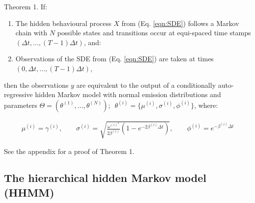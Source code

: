 \begin{theorem}{Theorem 1.}{}%
If:
\begin{enumerate}
    \item The hidden behavioural process $X$ from (Eq. \ref{eqn:SDE}) follows a Markov chain with $N$ possible states and transitions occur at equi-spaced time stamps $\left(\Delta t, \ldots, (T-1)\Delta t\right)$, and:
    \item Observations of the SDE from (Eq. \ref{eqn:SDE}) are taken at times $\left(0, \Delta t, \ldots, (T-1)\Delta t\right)$,
\end{enumerate}
then the observations $y$ are equivalent to the output of a conditionally auto-regressive hidden Markov model with normal emission distributions and parameters $\Theta = (\theta^{(1)}, \ldots, \theta^{(N)}); \enspace \theta^{(i)} = \{\mu^{(i)},\sigma^{(i)},\phi^{(i)}\}$, where:

\begin{align}
\mu^{(i)} = \gamma^{(i)}, \qquad \sigma^{(i)} = \sqrt{\frac{\omega^{(i)^2}}{2\beta^{(i)}} (1-e^{-2\beta^{(i)}\Delta t})}, \qquad \phi^{(i)} = e^{-\beta^{(i)}\Delta t} \label{eqn:CarHMM_to_OU}
\end{align}

\end{theorem}

See the appendix for a proof of Theorem 1.

\subsection{The hierarchical hidden Markov model (HHMM)}

